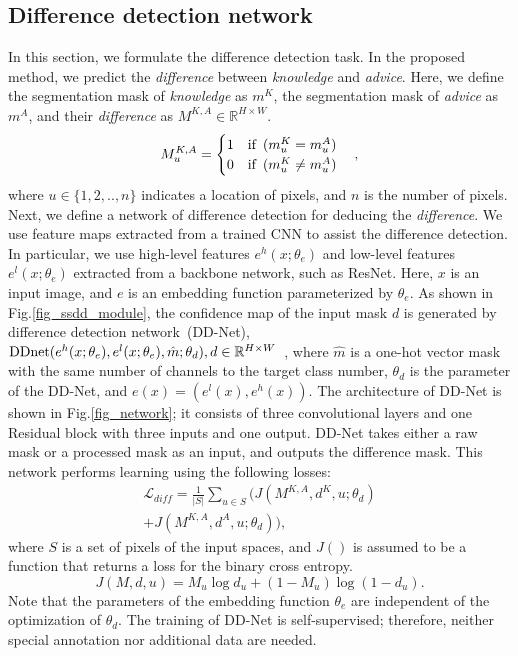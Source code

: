 \documentclass[10pt,twocolumn,letterpaper]{article}
\begin{document}
\subsection{Difference detection network}
In this section, we formulate the difference detection task.
In the proposed method, we predict the {\it difference} between {\it knowledge} and {\it advice}.
Here, we define the segmentation mask of {\it knowledge} as $ m^{K} $, the segmentation mask of {\it advice} as $ m^{A}$, and their {\it difference} as $ M^{K, A} \in {\mathbb R^{H \times W}} $.
\begin{equation}
 M^{K,A}_{u} =
\begin{cases}
  1&{\rm if}\hspace{1.5mm}(m^{K}_{u} = m^{A}_{u}) \\
  0&{\rm if}\hspace{1.5mm}(m^{K}_{u} \neq m^{A}_{u}) \\ 
\end{cases}
~~~,
\end{equation}
where $u \in \{1,2,..,n\}$ indicates a location of pixels, and $n$ is the number of pixels.
Next, we define a network of difference detection for deducing the {\it difference}.
We use feature maps extracted from a trained CNN to assist the difference detection.
In particular, we use high-level features $e^{h}(x;\theta_{e})$ and low-level features $e^{l}(x;\theta_{e})$
extracted from a backbone network, such as ResNet.
Here, $x$ is an input image, and $e$ is an embedding function parameterized by $\theta_{e}$.
As shown in Fig.\ref{fig_ssdd_module}, 
the confidence map of the input mask $d$ is generated by difference detection network~(DD-Net),
\footnotesize
${\rm DDnet}(e^{h}(x;\theta_{e}), e^{l}(x;\theta_{e}), \hat{m}; \theta_{d}), d \in {\mathbb R^{H \times W}}$~,
\normalsize
where 
$\hat{m}$ is a one-hot vector mask with the same number of channels to the target class number, $\theta_{d}$ is the parameter of the DD-Net, and $e(x)=(e^{l}(x),e^{h}(x))$.
The architecture of DD-Net is shown in Fig.\ref{fig_network}; it consists of three convolutional 
layers and one Residual block with three inputs and one output.
DD-Net takes either a raw mask or a processed mask as an input, and outputs the difference mask.
This network performs learning using the following losses:
\begin{equation}
\begin{split}
{\mathcal L}_{\mathit{diff}} = \frac{1}{|S|}\displaystyle{\sum_{u \in S}} (J(M^{K,A},d^{K},u;\theta_{d})\\
+ J(M^{K,A},d^{A}, u;\theta_{d})),
\end{split}
\end{equation}
where $S$ is a set of pixels of the input spaces, and $J()$ is assumed to be a function that returns a loss for the binary cross entropy.
\begin{displaymath}
 J(M,d,u)= M_{u}\log d_{u} +(1-M_{u})\log (1-d_{u}).
\end{displaymath}
Note that the parameters of the embedding function $\theta_{e}$ are independent of the optimization of $\theta_{d}$.
The training of DD-Net is self-supervised; therefore, neither special annotation nor additional data are needed.
\end{document}
